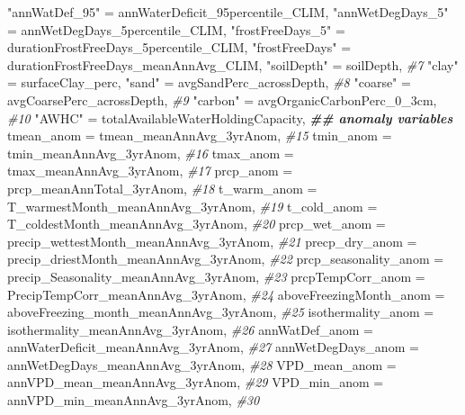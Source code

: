 \documentclass[
]{article}
\newenvironment{Shaded}{\begin{snugshade}}{\end{snugshade}}
\newcommand{\AttributeTok}[1]{\textcolor[rgb]{0.13,0.29,0.53}{#1}}
\newcommand{\CommentTok}[1]{\textcolor[rgb]{0.56,0.35,0.01}{\textit{#1}}}
\newcommand{\DocumentationTok}[1]{\textcolor[rgb]{0.56,0.35,0.01}{\textbf{\textit{#1}}}}
\newcommand{\NormalTok}[1]{#1}
\newcommand{\OtherTok}[1]{\textcolor[rgb]{0.56,0.35,0.01}{#1}}
\newcommand{\StringTok}[1]{\textcolor[rgb]{0.31,0.60,0.02}{#1}}
\begin{document}
\begin{Shaded}
\begin{Highlighting}[]
     \StringTok{"annWatDef\_95"} \OtherTok{=}\NormalTok{ annWaterDeficit\_95percentile\_CLIM, }
     \StringTok{"annWetDegDays\_5"} \OtherTok{=}\NormalTok{ annWetDegDays\_5percentile\_CLIM, }
     \StringTok{"frostFreeDays\_5"} \OtherTok{=}\NormalTok{ durationFrostFreeDays\_5percentile\_CLIM, }
     \StringTok{"frostFreeDays"} \OtherTok{=}\NormalTok{ durationFrostFreeDays\_meanAnnAvg\_CLIM, }
     \StringTok{"soilDepth"} \OtherTok{=}\NormalTok{ soilDepth, }\CommentTok{\#7}
     \StringTok{"clay"} \OtherTok{=}\NormalTok{ surfaceClay\_perc, }
     \StringTok{"sand"} \OtherTok{=}\NormalTok{ avgSandPerc\_acrossDepth, }\CommentTok{\#8}
     \StringTok{"coarse"} \OtherTok{=}\NormalTok{ avgCoarsePerc\_acrossDepth, }\CommentTok{\#9}
     \StringTok{"carbon"} \OtherTok{=}\NormalTok{ avgOrganicCarbonPerc\_0\_3cm, }\CommentTok{\#10}
     \StringTok{"AWHC"} \OtherTok{=}\NormalTok{ totalAvailableWaterHoldingCapacity,}
     \DocumentationTok{\#\# anomaly variables}
     \AttributeTok{tmean\_anom =}\NormalTok{ tmean\_meanAnnAvg\_3yrAnom, }\CommentTok{\#15}
     \AttributeTok{tmin\_anom =}\NormalTok{ tmin\_meanAnnAvg\_3yrAnom, }\CommentTok{\#16}
     \AttributeTok{tmax\_anom =}\NormalTok{ tmax\_meanAnnAvg\_3yrAnom, }\CommentTok{\#17}
    \AttributeTok{prcp\_anom =}\NormalTok{ prcp\_meanAnnTotal\_3yrAnom, }\CommentTok{\#18}
      \AttributeTok{t\_warm\_anom =}\NormalTok{ T\_warmestMonth\_meanAnnAvg\_3yrAnom,  }\CommentTok{\#19}
     \AttributeTok{t\_cold\_anom =}\NormalTok{ T\_coldestMonth\_meanAnnAvg\_3yrAnom, }\CommentTok{\#20}
      \AttributeTok{prcp\_wet\_anom =}\NormalTok{ precip\_wettestMonth\_meanAnnAvg\_3yrAnom, }\CommentTok{\#21}
      \AttributeTok{precp\_dry\_anom =}\NormalTok{ precip\_driestMonth\_meanAnnAvg\_3yrAnom,  }\CommentTok{\#22}
    \AttributeTok{prcp\_seasonality\_anom =}\NormalTok{ precip\_Seasonality\_meanAnnAvg\_3yrAnom, }\CommentTok{\#23 }
     \AttributeTok{prcpTempCorr\_anom =}\NormalTok{ PrecipTempCorr\_meanAnnAvg\_3yrAnom, }\CommentTok{\#24}
      \AttributeTok{aboveFreezingMonth\_anom =}\NormalTok{ aboveFreezing\_month\_meanAnnAvg\_3yrAnom, }\CommentTok{\#25  }
    \AttributeTok{isothermality\_anom =}\NormalTok{ isothermality\_meanAnnAvg\_3yrAnom, }\CommentTok{\#26}
       \AttributeTok{annWatDef\_anom =}\NormalTok{ annWaterDeficit\_meanAnnAvg\_3yrAnom, }\CommentTok{\#27}
     \AttributeTok{annWetDegDays\_anom =}\NormalTok{ annWetDegDays\_meanAnnAvg\_3yrAnom,  }\CommentTok{\#28}
      \AttributeTok{VPD\_mean\_anom =}\NormalTok{ annVPD\_mean\_meanAnnAvg\_3yrAnom, }\CommentTok{\#29}
      \AttributeTok{VPD\_min\_anom =}\NormalTok{ annVPD\_min\_meanAnnAvg\_3yrAnom,  }\CommentTok{\#30}

\end{Highlighting}
\end{Shaded}
\end{document}

